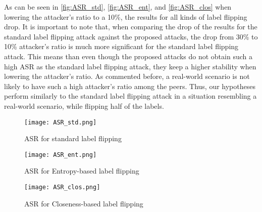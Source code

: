 As can be seen in \autoref{fig:ASR_std}, \autoref{fig:ASR_ent}, and \autoref{fig:ASR_clos} when lowering the attacker's ratio to a 10\%, the results for all kinds of label flipping drop. It is important to note that, when comparing the drop of the results for the standard label flipping attack against the proposed attacks, the drop from 30\% to 10\% attacker's ratio is much more significant for the standard label flipping attack. This means than even though the proposed attacks do not obtain such a high ASR as the standard label flipping attack, they keep a higher stability when lowering the attacker's ratio. As commented before, a real-world scenario is not likely to have such a high attacker's ratio among the peers. Thus, our hypotheses perform similarly to the standard label flipping attack in a situation resembling a real-world scenario, while flipping half of the labels.

\begin{figure}[h!]
    \centering
    \texttt{[image: ASR\_std.png]}
    \caption{ASR for standard label flipping}
    \label{fig:ASR_std}
\end{figure}

\begin{figure}[h!]
    \centering
    \texttt{[image: ASR\_ent.png]}
    \caption{ASR for Entropy-based label flipping}
    \label{fig:ASR_ent}
\end{figure}

\begin{figure}[h!]
    \centering
    \texttt{[image: ASR\_clos.png]}
    \caption{ASR for Closeness-based label flipping}
    \label{fig:ASR_clos}
\end{figure}
 
\pagebreak
